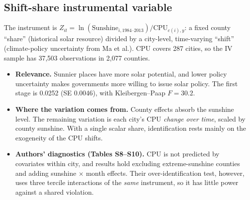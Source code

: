 \documentclass[11pt]{article}
\begin{document}
\subsection{Shift-share instrumental variable}
The instrument is $Z_{it}=\ln(\text{Sunshine}_{i,1984\text{--}2013})/\text{CPU}_{c(i),y}$: a fixed county ``share'' (historical solar resource) divided by a city-level, time-varying ``shift'' (climate-policy uncertainty from Ma et al.). CPU covers 287 cities, so the IV sample has 37,503 observations in 2,077 counties.
\begin{itemize}
\item \textbf{Relevance.} Sunnier places have more solar potential, and lower policy uncertainty makes governments more willing to issue solar policy. The first stage is 0.0252 (SE 0.0046), with Kleibergen--Paap $F=30.2$.
\item \textbf{Where the variation comes from.} County effects absorb the sunshine level. The remaining variation is each city's CPU \emph{change over time}, scaled by county sunshine. With a single scalar share, identification rests mainly on the exogeneity of the CPU shifts.
\item \textbf{Authors' diagnostics (Tables S8--S10).} CPU is not predicted by covariates within city, and results hold excluding extreme-sunshine counties and adding sunshine $\times$ month effects. Their over-identification test, however, uses three tercile interactions of the \emph{same} instrument, so it has little power against a shared violation.
\end{itemize}
\end{document}
